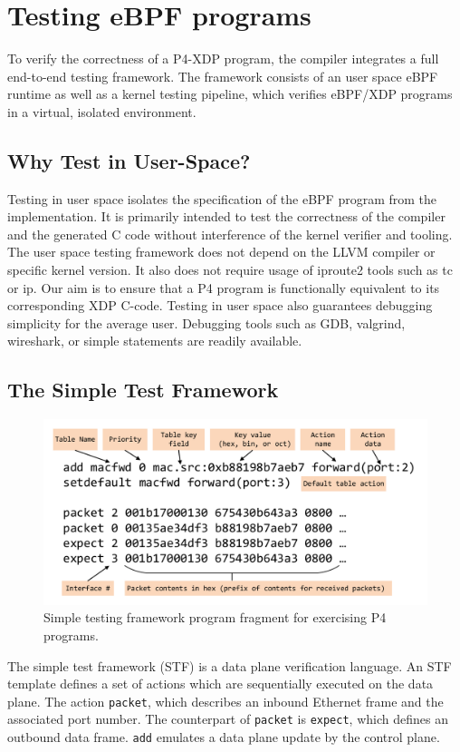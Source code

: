 \section{Testing eBPF programs}\label{sec:testing}
To verify the correctness of a P4-XDP program, the compiler integrates a full
end-to-end testing framework. The framework consists of an user space eBPF
runtime as well as a kernel testing pipeline, which verifies eBPF/XDP programs
in a virtual, isolated environment.

\subsection{Why Test in User-Space?}
Testing in user space isolates the specification of the eBPF program from the
implementation. It is primarily intended to test the correctness of the
compiler and the generated C code without interference of the kernel verifier
and tooling. The user space testing framework does not depend on the LLVM
compiler or specific kernel version. It also does not require usage of iproute2 
tools such as tc or ip. Our aim is to ensure that a P4 program is functionally
equivalent to its corresponding XDP C-code.
Testing in user space also guarantees debugging simplicity for the average
user. Debugging tools such as GDB, valgrind, wireshark, or simple statements
are readily available.

\subsection{The Simple Test Framework}
\begin{figure}
	\centering
	\includegraphics[width=\linewidth]{stf}
	\caption{Simple testing framework program fragment for exercising P4 programs.}
	\label{fig:stf}
\end{figure}
The simple test framework (STF) is a data plane verification language. 
An STF template defines a set of actions which are sequentially executed on the 
data plane.
The action \texttt{packet}, which describes an inbound Ethernet frame and the 
associated port number. The counterpart of \texttt{packet} is \texttt{expect}, 
which defines an outbound data frame. \texttt{add} emulates a data plane update 
by the control plane.

